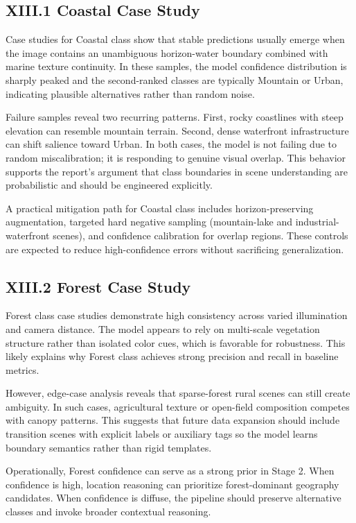 \subsection*{XIII.1 Coastal Case Study}
Case studies for Coastal class show that stable predictions usually emerge when the image contains an unambiguous horizon-water boundary combined with marine texture continuity. In these samples, the model confidence distribution is sharply peaked and the second-ranked classes are typically Mountain or Urban, indicating plausible alternatives rather than random noise.

Failure samples reveal two recurring patterns. First, rocky coastlines with steep elevation can resemble mountain terrain. Second, dense waterfront infrastructure can shift salience toward Urban. In both cases, the model is not failing due to random miscalibration; it is responding to genuine visual overlap. This behavior supports the report's argument that class boundaries in scene understanding are probabilistic and should be engineered explicitly.

A practical mitigation path for Coastal class includes horizon-preserving augmentation, targeted hard negative sampling (mountain-lake and industrial-waterfront scenes), and confidence calibration for overlap regions. These controls are expected to reduce high-confidence errors without sacrificing generalization.

\subsection*{XIII.2 Forest Case Study}
Forest class case studies demonstrate high consistency across varied illumination and camera distance. The model appears to rely on multi-scale vegetation structure rather than isolated color cues, which is favorable for robustness. This likely explains why Forest class achieves strong precision and recall in baseline metrics.

However, edge-case analysis reveals that sparse-forest rural scenes can still create ambiguity. In such cases, agricultural texture or open-field composition competes with canopy patterns. This suggests that future data expansion should include transition scenes with explicit labels or auxiliary tags so the model learns boundary semantics rather than rigid templates.

Operationally, Forest confidence can serve as a strong prior in Stage 2. When confidence is high, location reasoning can prioritize forest-dominant geography candidates. When confidence is diffuse, the pipeline should preserve alternative classes and invoke broader contextual reasoning.

